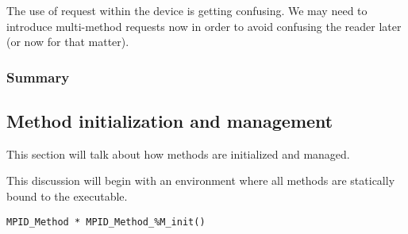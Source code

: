 \begin{cmt}
  The use of request within the device is getting confusing.  We may need to
  introduce multi-method requests now in order to avoid confusing the reader
  later (or now for that matter).
\end{cmt}







\subsubsection{Summary}



\subsection{Method initialization and management}

This section will talk about how methods are initialized and managed.

This discussion will begin with an environment where all methods are
statically bound to the executable.

\begin{verbatim}
MPID_Method * MPID_Method_%M_init()
\end{verbatim}

